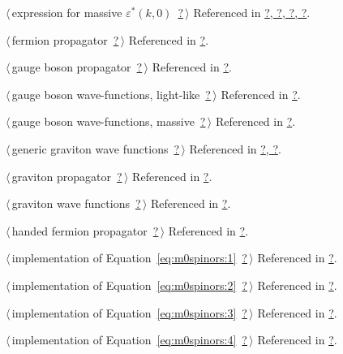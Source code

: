 \documentclass[a4paper,12pt]{amsart}
\renewcommand{\NWlink}[2]{\hyperlink{#1}{#2}}
\renewcommand{\NWtxtRefIn}{Referenced in}
\begin{document}
{\begin{list}{}{\setlength{\itemsep}{-\parsep}\setlength{\itemindent}{-\leftmargin}}
{}
\item $\langle\,$expression for massive $\varepsilon^\ast(k, 0)$\nobreak\ {\footnotesize \NWlink{nuweb?}{?}}$\,\rangle$ {\footnotesize {\NWtxtRefIn} \NWlink{nuweb?}{?}\NWlink{nuweb?}{, ?}\NWlink{nuweb?}{, ?}\NWlink{nuweb?}{, ?}.
}
\item $\langle\,$fermion propagator\nobreak\ {\footnotesize \NWlink{nuweb?}{?}}$\,\rangle$ {\footnotesize {\NWtxtRefIn} \NWlink{nuweb?}{?}.}
\item $\langle\,$gauge boson propagator\nobreak\ {\footnotesize \NWlink{nuweb?}{?}}$\,\rangle$ {\footnotesize {\NWtxtRefIn} \NWlink{nuweb?}{?}.}
\item $\langle\,$gauge boson wave-functions, light-like\nobreak\ {\footnotesize \NWlink{nuweb?}{?}}$\,\rangle$ {\footnotesize {\NWtxtRefIn} \NWlink{nuweb?}{?}.}
\item $\langle\,$gauge boson wave-functions, massive\nobreak\ {\footnotesize \NWlink{nuweb?}{?}}$\,\rangle$ {\footnotesize {\NWtxtRefIn} \NWlink{nuweb?}{?}.}
\item $\langle\,$generic graviton wave functions\nobreak\ {\footnotesize \NWlink{nuweb?}{?}}$\,\rangle$ {\footnotesize {\NWtxtRefIn} \NWlink{nuweb?}{?}\NWlink{nuweb?}{, ?}.
}
\item $\langle\,$graviton propagator\nobreak\ {\footnotesize \NWlink{nuweb?}{?}}$\,\rangle$ {\footnotesize {\NWtxtRefIn} \NWlink{nuweb?}{?}.}
\item $\langle\,$graviton wave functions\nobreak\ {\footnotesize \NWlink{nuweb?}{?}}$\,\rangle$ {\footnotesize {\NWtxtRefIn} \NWlink{nuweb?}{?}.}
\item $\langle\,$handed fermion propagator\nobreak\ {\footnotesize \NWlink{nuweb?}{?}}$\,\rangle$ {\footnotesize {\NWtxtRefIn} \NWlink{nuweb?}{?}.}
\item $\langle\,$implementation of Equation~\eqref{eq:m0spinors:1}\nobreak\ {\footnotesize \NWlink{nuweb?}{?}}$\,\rangle$ {\footnotesize {\NWtxtRefIn} \NWlink{nuweb?}{?}.}
\item $\langle\,$implementation of Equation~\eqref{eq:m0spinors:2}\nobreak\ {\footnotesize \NWlink{nuweb?}{?}}$\,\rangle$ {\footnotesize {\NWtxtRefIn} \NWlink{nuweb?}{?}.}
\item $\langle\,$implementation of Equation~\eqref{eq:m0spinors:3}\nobreak\ {\footnotesize \NWlink{nuweb?}{?}}$\,\rangle$ {\footnotesize {\NWtxtRefIn} \NWlink{nuweb?}{?}.}
\item $\langle\,$implementation of Equation~\eqref{eq:m0spinors:4}\nobreak\ {\footnotesize \NWlink{nuweb?}{?}}$\,\rangle$ {\footnotesize {\NWtxtRefIn} \NWlink{nuweb?}{?}.}

\end{list}}
\end{document}
